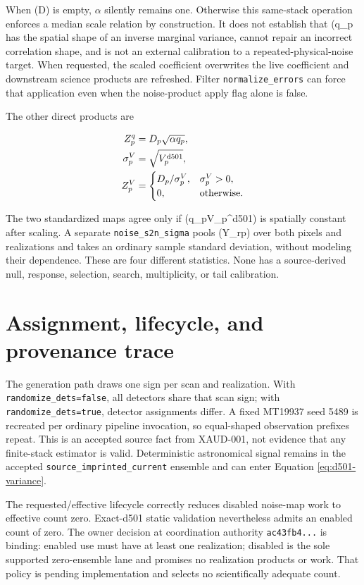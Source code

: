 \documentclass[11pt]{article}
\newcommand{\code}[1]{\nolinkurl{#1}}
\begin{document}
When (D) is empty, \(\alpha\) silently remains one.  Otherwise this same-stack
operation enforces a median scale relation by construction.  It does not
establish that (q_p\) has the spatial shape of an inverse marginal variance,
cannot repair an incorrect correlation shape, and is not an external
calibration to a repeated-physical-noise target.  When requested, the scaled
coefficient overwrites the live coefficient and downstream science products
are refreshed.  Filter \code{normalize_errors} can force that application even
when the noise-product apply flag alone is false.

The other direct products are

\begin{align}
 Z_p^{q} &= D_p\sqrt{\alpha q_p},\\
 \sigma_p^{V} &= \sqrt{V_p^{\rm d501}},\\
 Z_p^{V} &=
 \begin{cases}D_p/\sigma_p^{V},&\sigma_p^{V}>0,\\0,&\text{otherwise.}\end{cases}
 \label{eq:d501-snr-family}
\end{align}

The two standardized maps agree only if (q_pV_p^{\rm d501}) is spatially
constant after scaling.  A separate \code{noise_s2n_sigma} pools
(Y_{rp}) over both pixels and realizations and takes an ordinary
sample standard deviation, without modeling their dependence.  These are four
different statistics.  None has a source-derived null, response, selection,
search, multiplicity, or tail calibration.

\section{Assignment, lifecycle, and provenance trace}

The generation path draws one sign per scan and realization.  With
\code{randomize_dets=false}, all detectors share that scan sign; with
\code{randomize_dets=true}, detector assignments differ.  A fixed MT19937 seed
5489 is recreated per ordinary pipeline invocation, so equal-shaped
observation prefixes repeat.  This is an accepted source fact from XAUD-001,
not evidence that any finite-stack estimator is valid.  Deterministic
astronomical signal remains in the accepted
\code{source_imprinted_current} ensemble and can enter Equation
\eqref{eq:d501-variance}.

The requested/effective lifecycle correctly reduces disabled noise-map work to
effective count zero.  Exact-d501 static validation nevertheless admits an
enabled count of zero.  The owner decision at coordination authority
\code{ac43fb4...} is binding: enabled use must have at least one realization;
disabled is the sole supported zero-ensemble lane and promises no realization
products or work.  That policy is pending implementation and selects no
scientifically adequate count.
\end{document}
